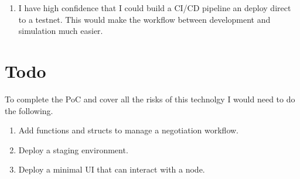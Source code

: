 \begin{enumerate}
    \item I have high confidence that I could build a CI/CD pipeline an deploy direct to a testnet.
        This would make the workflow between development and simulation much easier.
\end{enumerate}


\section{Todo}

To complete the PoC and cover all the risks of this technolgy I would need to do the following.

\begin{enumerate}
    \item Add functions and structs to manage a negotiation workflow.
    \item Deploy a staging environment.
    \item Deploy a minimal UI that can interact with a node.
\end{enumerate}